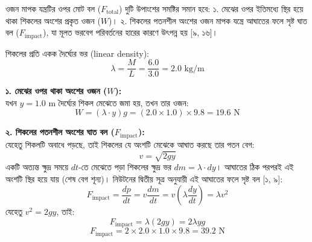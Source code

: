 \documentclass[12pt, a4paper]{article}
\begin{document}
\begin{tcolorbox}[solutionbox={সমাধান (Solution)}]
\noindent
ওজন মাপক যন্ত্রটির ওপর মোট বল ($F_{\text{total}}$) দুটি উপাংশের সমষ্টির সমান হবে: 
১. মেঝের ওপর ইতিমধ্যে স্থির হয়ে থাকা শিকলের অংশের প্রকৃত ওজন ($W$)। 
২. শিকলের পতনশীল অংশের ওজন মাপক যন্ত্রে আঘাতের ফলে সৃষ্ট ঘাত বল ($F_{\text{impact}}$), যা মূলত ভরবেগ পরিবর্তনের হারের কারণে উৎপন্ন হয় [৯, ১৬]।

\vspace{0.3em}
\noindent
শিকলের প্রতি একক দৈর্ঘ্যের ভর (linear density): 
$$\lambda = \frac{M}{L} = \frac{6.0}{3.0} = 2.0\text{ kg/m}$$

\vspace{0.5em}
\noindent
\textbf{১. মেঝের ওপর থাকা অংশের ওজন ($W$):} \\
যখন $y = 1.0\text{ m}$ দৈর্ঘ্যের শিকল মেঝেতে জমা হয়, তখন তার ওজন:
$$W = (\lambda \cdot y)g = (2.0 \times 1.0) \times 9.8 = 19.6\text{ N}$$

\vspace{0.5em}
\noindent
\textbf{২. শিকলের পতনশীল অংশের ঘাত বল ($F_{\text{impact}}$):} \\
যেহেতু শিকলটি অবাধে পড়ছে, তাই শিকলের যে অংশটি মেঝেকে আঘাত করছে তার পতন বেগ:
$$v = \sqrt{2gy}$$
একটি অত্যন্ত ক্ষুদ্র সময়ে $dt$-তে মেঝেতে পড়া শিকলের ক্ষুদ্র ভর $dm = \lambda \cdot dy$। আঘাতের ঠিক পরপরই এই অংশটি স্থির হয়ে যায় (শেষ বেগ শূন্য)। নিউটনের দ্বিতীয় সূত্র অনুযায়ী এই আঘাতের ফলে সৃষ্ট বল [১, ৯]:
$$F_{\text{impact}} = \frac{dp}{dt} = v \frac{dm}{dt} = v \left( \lambda \frac{dy}{dt} \right) = \lambda v^2$$
যেহেতু $v^2 = 2gy$, তাই:
$$F_{\text{impact}} = \lambda (2gy) = 2\lambda yg$$ 
$$F_{\text{impact}} = 2 \times 2.0 \times 1.0 \times 9.8 = 39.2\text{ N}$$

\vspace{1em}
\begin{center}
\end{center}
\end{tcolorbox}
\end{document}

